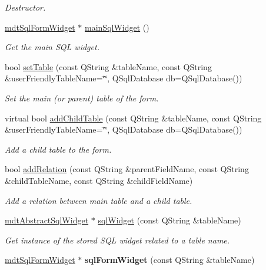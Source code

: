 \begin{DoxyCompactItemize}
\begin{DoxyCompactList}\small\item\em Destructor. \end{DoxyCompactList}\item 
\hyperlink{classmdt_sql_form_widget}{mdtSqlFormWidget} $\ast$ \hyperlink{classmdt_sql_form_a857fc9370e2054408ae8b42e8deedbf5}{mainSqlWidget} ()
\begin{DoxyCompactList}\small\item\em Get the main SQL widget. \end{DoxyCompactList}\item 
bool \hyperlink{classmdt_sql_form_a8a3c5c3fa87da8a1b45c287e08f069c1}{setTable} (const QString \&tableName, const QString \&userFriendlyTableName=\char`\"{}\char`\"{}, QSqlDatabase db=QSqlDatabase())
\begin{DoxyCompactList}\small\item\em Set the main (or parent) table of the form. \end{DoxyCompactList}\item 
virtual bool \hyperlink{classmdt_sql_form_a75710fca8759142a5cebb53fa4184906}{addChildTable} (const QString \&tableName, const QString \&userFriendlyTableName=\char`\"{}\char`\"{}, QSqlDatabase db=QSqlDatabase())
\begin{DoxyCompactList}\small\item\em Add a child table to the form. \end{DoxyCompactList}\item 
bool \hyperlink{classmdt_sql_form_a69ad7e92c8a4042ea9808a0a97d2bf65}{addRelation} (const QString \&parentFieldName, const QString \&childTableName, const QString \&childFieldName)
\begin{DoxyCompactList}\small\item\em Add a relation between main table and a child table. \end{DoxyCompactList}\item 
\hyperlink{classmdt_abstract_sql_widget}{mdtAbstractSqlWidget} $\ast$ \hyperlink{classmdt_sql_form_a345555605914bf8198d093abdd3cda1e}{sqlWidget} (const QString \&tableName)
\begin{DoxyCompactList}\small\item\em Get instance of the stored SQL widget related to a table name. \end{DoxyCompactList}\item 
\hypertarget{classmdt_sql_form_a59dc3afec69c8b6a18ed7fccb42c70ad}{
\hyperlink{classmdt_sql_form_widget}{mdtSqlFormWidget} $\ast$ {\bfseries sqlFormWidget} (const QString \&tableName)}
\label{classmdt_sql_form_a59dc3afec69c8b6a18ed7fccb42c70ad}


\end{DoxyCompactItemize}
